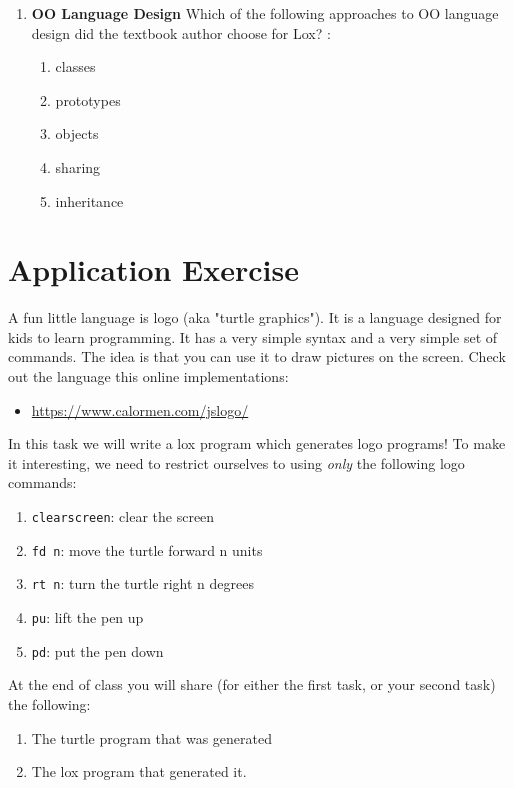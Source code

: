 \documentclass[twoside=false, DIV=14]{scrartcl}
\begin{document}
\begin{enumerate}
\item \textbf{OO Language Design}
Which of the following approaches to OO language design did the textbook author choose for Lox? :
\begin{enumerate}
    \item \tick  classes
    \item \tick  prototypes
    \item objects
    \item sharing
    \item inheritance
\end{enumerate}
  
\end{enumerate}

\newpage
\part*{Application Exercise}

A fun little language is logo (aka "turtle graphics").  It is a language designed for kids to learn programming.  It has a very simple syntax and a very simple set of commands.  The idea is that you can use it to draw pictures on the screen.  Check out the language this online implementations:
\begin{itemize}
  \item \url{https://www.calormen.com/jslogo/}
\end{itemize}
In this task we will write a lox program which generates logo programs!  To make it interesting, we need to restrict ourselves to using \emph{only} the following logo commands:
\begin{enumerate}
\item \lstinline|clearscreen|: clear the screen
\item \lstinline|fd n|: move the turtle forward n units
\item \lstinline|rt n|: turn the turtle right n degrees
\item \lstinline|pu|: lift the pen up
\item \lstinline|pd|: put the pen down
\end{enumerate}

At the end of class you will share (for either the first task, or your second task) the following:
\begin{enumerate}
  \item The turtle program that was generated
  \item The lox program that generated it.
\end{enumerate}
\end{document}
